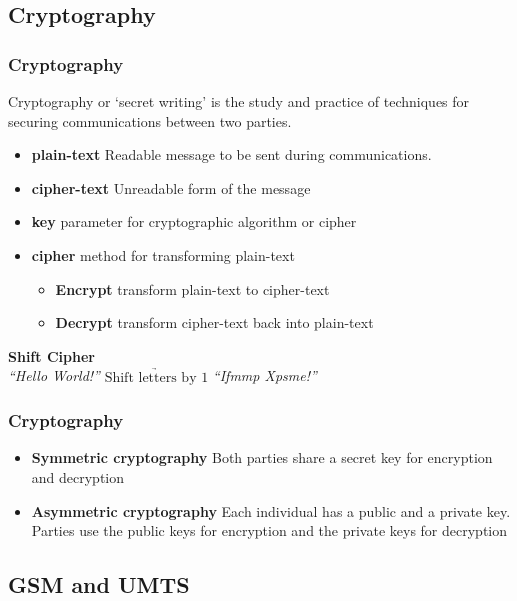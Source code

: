 \documentclass{beamer}
\begin{document}
\subsection{Cryptography}
	\begin{frame}
	\frametitle{Cryptography}
	
		Cryptography or `secret writing' is the study and practice of techniques for securing communications between two parties. \linebreak
		\begin{itemize}
			\item \textbf{plain-text}  Readable message to be sent during communications.
			\item \textbf{cipher-text} Unreadable form of the message
			\item \textbf{key} parameter for cryptographic algorithm or cipher		
			\item \textbf{cipher} method for transforming plain-text
			\begin{itemize}
				\item \textbf{Encrypt} transform plain-text to cipher-text
				\item \textbf{Decrypt} transform cipher-text back into plain-text
			\end{itemize}
		\end{itemize}		
		\textbf{Shift Cipher}\\

		\textit{``Hello World!''} $\underrightarrow{\text{Shift letters by 1}}$ \textit{``Ifmmp Xpsme!''} 
	
	\end{frame}
	\begin{frame}
	\frametitle{Cryptography}
		\begin{itemize}
			\item \textbf{Symmetric cryptography} 
			Both parties share a secret key for encryption and decryption
			\item \textbf{Asymmetric cryptography}
			Each individual has a public and a private key. Parties use the public keys for encryption and the private keys for decryption
		\end{itemize}
	
	\end{frame}
\subsection{GSM and UMTS}
	
\end{document}
